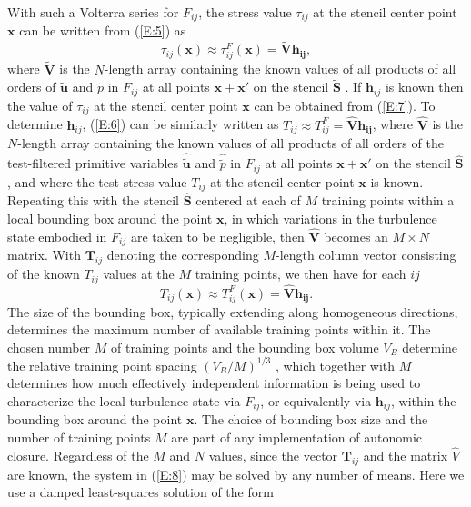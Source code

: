 With such a Volterra series for $F_{ij}$, the stress value $\tau_{ij}$   at the stencil center point $\mathbf{x}$ can be written from (\ref{E:5}) as
%
\begin{equation}
	\label{E:7}
	\tau_{ij}(\mathbf{x}) \approx  \tau_{ij}^{F}(\mathbf{x})
	= \mathbf{\widetilde{V}h_{ij}}, 
\end{equation}
%
%         
where $\widetilde{\mathbf{V}}$  is the $N$-length array containing the known values of all products of all orders of   $\widetilde{\mathbf{u}}$  and $\widetilde{p}$   in $F_{ij}$  at all points $\mathbf{x} +\mathbf{x'} $  on the stencil $\widetilde{\mathbf{S}}$  . If $\mathbf{h}_{ij}$  is known then the value of  $\tau_{ij}$ at the stencil center point $\mathbf{x}$ can be obtained from (\ref{E:7}). To determine  $\mathbf{h}_{ij}$, (\ref{E:6}) can be similarly written as $T_{ij} \approx T_{ij}^{F} = \mathbf{\widehat{V}h_{ij}}$, where $\mathbf{\widehat{V}}$  is the $N$-length array containing the known values of all products of all orders of the test-filtered primitive variables  $\widehat{\widetilde{\mathbf{u}}}$  and  $\widehat{{\widetilde{p}}}$   in  $F_{ij}$ at all points $\mathbf{x} +\mathbf{x'} $  on the stencil $\widehat{\mathbf{S}}$, and where the test stress value $T_{ij}$   at the stencil center point $\mathbf{x}$ is known. Repeating this with the stencil ${\widehat{\mathbf{S}}}$  centered at each of $M$ training points within a local bounding box around the point $\mathbf{x}$, in which variations in the turbulence state embodied in  $F_{ij}$ are taken to be negligible, then $\mathbf{\widehat{V}}$   becomes an  $M \times N$ matrix. With $\mathbf{T}_{ij}$  denoting the corresponding $M$-length column vector consisting of the known  $T_{ij}$ values at the $M$ training points, we then have for each $ij$
%
\begin{equation}
	\label{E:8}
	T_{ij}(\mathbf{x}) \approx  T_{ij}^{F}(\mathbf{x})
	= \mathbf{\widehat{V}h_{ij}}.
\end{equation}
%
%      
The size of the bounding box, typically extending along homogeneous directions, determines the maximum number of available training points within it. The chosen number $M$ of training points and the bounding box volume $V_B$  determine the relative training point spacing $(V_B/M)^{1/3}$  , which together with $M$ determines how much effectively independent information is being used to characterize the local turbulence state via $F_{ij}$, or equivalently via $\mathbf{h}_{ij}$, within the bounding box around the point $\mathbf{x}$. The choice of bounding box size and the number of training points $M$ are part of any implementation of autonomic closure. Regardless of the $M$ and $N$ values, since the vector  $\mathbf{T}_{ij}$ and the matrix $\widehat{V}$   are known, the system in (\ref{E:8}) may be solved by any number of means. Here we use a damped least-squares solution \cite{king2016autonomic} of the form

